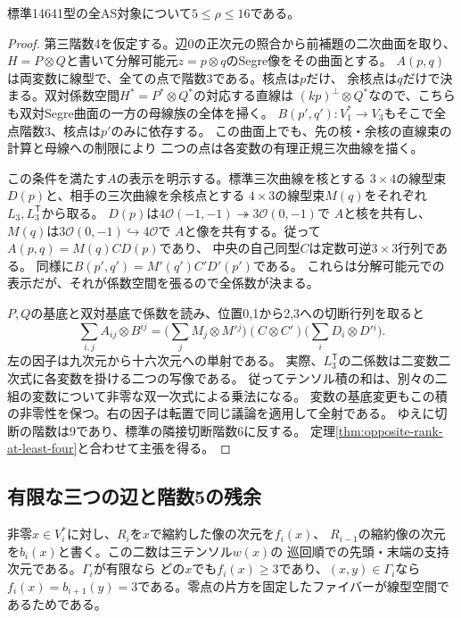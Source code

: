 \begin{theorem}[標準AS対象の第三階数は5以上]\label{thm:as-opposite-rank-five-lower}
標準14641型の全AS対象について$5\le\rho\le16$である。
\end{theorem}
\begin{proof}
第三階数4を仮定する。辺0の正次元の照合から前補題の二次曲面を取り、
$H=P\otimes Q$と書いて分解可能元$z=p\otimes q$のSegre像をその曲面とする。
$A(p,q)$は両変数に線型で、全ての点で階数3である。核点は$p$だけ、
余核点は$q$だけで決まる。双対係数空間$H^*=P^*\otimes Q^*$の対応する直線は
$(kp)^\perp\otimes Q^*$なので、こちらも双対Segre曲面の一方の母線族の全体を掃く。
$B(p',q'):V_1^*\to V_3$もそこで全点階数3、核点は$p'$のみに依存する。
この曲面上でも、先の核・余核の直線束の計算と母線への制限により
二つの点は各変数の有理正規三次曲線を描く。

この条件を満たす$A$の表示を明示する。標準三次曲線を核とする
$3\times4$の線型束$D(p)$と、相手の三次曲線を余核点とする
$4\times3$の線型束$M(q)$をそれぞれ$L_3,L_3^{\mathsf T}$から取る。
$D(p)$は$4\mathcal O(-1,-1)\twoheadrightarrow3\mathcal O(0,-1)$で
$A$と核を共有し、$M(q)$は$3\mathcal O(0,-1)\hookrightarrow4\mathcal O$で
$A$と像を共有する。従って$A(p,q)=M(q)C D(p)$であり、
中央の自己同型$C$は定数可逆$3\times3$行列である。
同様に$B(p',q')=M'(q')C'D'(p')$である。
これらは分解可能元での表示だが、それが係数空間を張るので全係数が決まる。

$P,Q$の基底と双対基底で係数を読み、位置0,1から2,3への切断行列を取ると
\[
 \sum_{i,j} A_{ij}\otimes B^{ij}
 =\Big(\sum_j M_j\otimes M'{}^{j}\Big)(C\otimes C')
   \Big(\sum_i D_i\otimes D'{}^{i}\Big).
\]
左の因子は九次元から十六次元への単射である。
実際、$L_3^{\mathsf T}$の二係数は二変数二次式に各変数を掛ける二つの写像である。
従ってテンソル積の和は、別々の二組の変数について非零な双一次式による乗法になる。
変数の基底変更もこの積の非零性を保つ。右の因子は転置で同じ議論を適用して全射である。
ゆえに切断の階数は9であり、標準の隣接切断階数6に反する。
定理\ref{thm:opposite-rank-at-least-four}と合わせて主張を得る。
\end{proof}

\subsection{有限な三つの辺と階数5の残余}
非零$x\in V_i^*$に対し、$R_i$を$x$で縮約した像の次元を$f_i(x)$、
$R_{i-1}$の縮約像の次元を$b_i(x)$と書く。この二数は三テンソル$w(x)$の
巡回順での先頭・末端の支持次元である。$\Gamma_i$が有限なら
どの$x$でも$f_i(x)\ge3$であり、$(x,y)\in\Gamma_i$なら
$f_i(x)=b_{i+1}(y)=3$である。零点の片方を固定したファイバーが線型空間であるためである。

